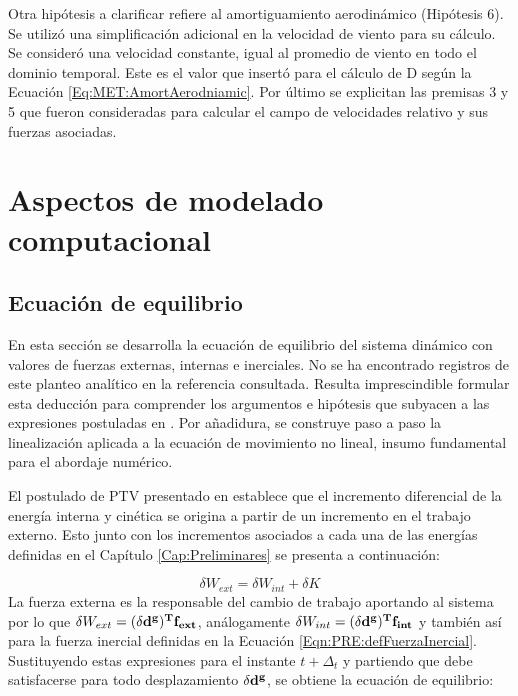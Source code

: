 Otra hipótesis a clarificar refiere al amortiguamiento aerodinámico (Hipótesis 6). Se utilizó una simplificación adicional en la velocidad de viento para su cálculo. Se consideró una velocidad constante, igual al promedio de viento en todo el dominio temporal. Este es el valor que insertó para el cálculo de D según la Ecuación \eqref{Eq:MET:AmortAerodniamic}. Por último se explicitan las premisas 3 y 5 que fueron consideradas para calcular el campo de velocidades relativo y sus fuerzas asociadas.  
\section{Aspectos de modelado computacional}\label{Sec:MET:ModeladoComput}
\subsection{Ecuación de equilibrio}\label{Sec:MET:EqEquilibrio}

En esta sección se desarrolla la ecuación de equilibrio del sistema dinámico con valores de fuerzas externas, internas e inerciales. No se ha encontrado registros de este planteo analítico en la referencia consultada. Resulta imprescindible formular esta deducción para comprender los argumentos e hipótesis que subyacen a las expresiones postuladas en \citep{Le2014}. Por añadidura, se construye paso a paso la linealización aplicada a la ecuación de movimiento no lineal, insumo fundamental para el abordaje numérico. 

 El postulado de PTV presentado en \cite{Crisfield} establece que el incremento diferencial de la energía interna y cinética se origina a partir de un incremento en el trabajo externo. Esto junto con los incrementos asociados a cada una de las energías definidas en el Capítulo \ref{Cap:Preliminares} se presenta a continuación:
 
 \begin{equation}
 	\delta W_{ext}=\delta W_{int} +\delta K
 \end{equation}
La fuerza externa es la responsable del cambio de trabajo aportando al sistema por lo que $\delta W_{ext}=(\delta \bf{d}^g)^T\bf{f}_{ext}$, análogamente $\delta W_{int}=(\delta \bf{d}^g)^T\bf{f}_{int}$ y también así para la fuerza inercial definidas en la Ecuación \eqref{Eqn:PRE:defFuerzaInercial}. Sustituyendo estas expresiones para el instante $t + \Delta_t$ y partiendo que debe satisfacerse para todo desplazamiento $ \delta \bf{d}^g$, se obtiene la ecuación de equilibrio: 

